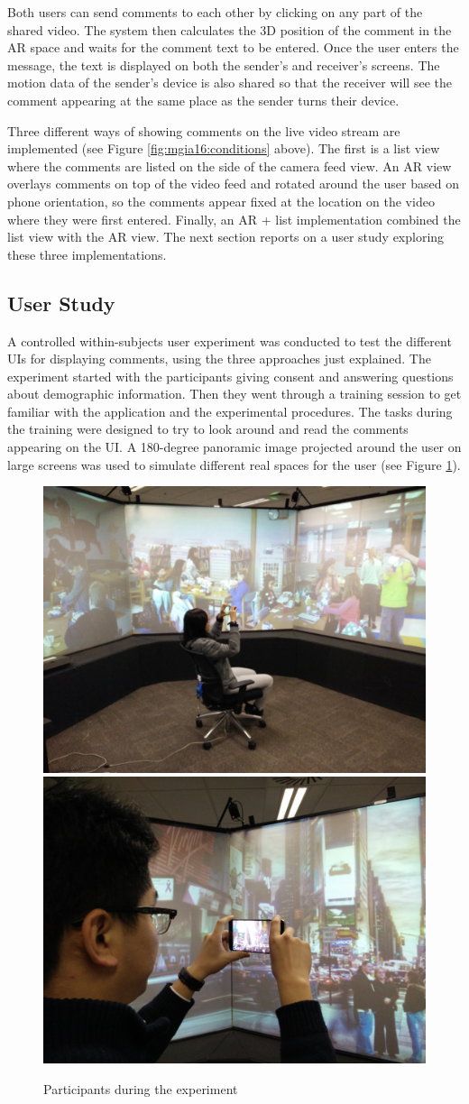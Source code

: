 Both users can send comments to each other by clicking on any part of the shared video. The system then calculates the 3D position of the comment in the AR space and waits for the comment text to be entered. Once the user enters the message, the text is displayed on both the sender's and receiver's screens. The motion data of the sender's device is also shared so that the receiver will see the comment appearing at the same place as the sender turns their device. 

Three different ways of showing comments on the live video stream are implemented (see Figure \ref{fig:mgia16:conditions} above). The first is a list view where the comments are listed on the side of the camera feed view. An AR view overlays comments on top of the video feed and rotated around the user based on phone orientation, so the comments appear fixed at the location on the video where they were first entered. Finally, an AR + list implementation combined the list view with the AR view. The next section reports on a user study exploring these three implementations.


\subsection{User Study}

A controlled within-subjects user experiment was conducted to test the different UIs for displaying comments, using the three approaches just explained. The experiment started with the participants giving consent and answering questions about demographic information. Then they went through a training session to get familiar with the application and the experimental procedures. The tasks during the training were designed to try to look around and read the comments appearing on the UI. A 180-degree panoramic image projected around the user on large screens was used to simulate different real spaces for the user (see Figure \ref{fig:mgia16:participant}). 

\begin{figure}[ht]
  \centering
  \includegraphics[width=0.45\linewidth]{images/61-video-mgia16/participant1}
  \includegraphics[width=0.45\linewidth]{images/61-video-mgia16/participant2}
  \caption{Participants during the experiment}
    \label{fig:mgia16:participant}
\end{figure}

